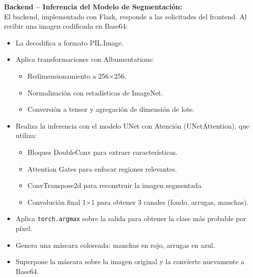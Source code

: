 \textbf{Backend – Inferencia del Modelo de Segmentación:}
\\
El backend, implementado con Flask, responde a las solicitudes del frontend. Al recibir una imagen codificada en Base64:
\begin{itemize}
\item La decodifica a formato PIL.Image.
\item Aplica transformaciones con Albumentations:
  \begin{itemize}
    \item Redimensionamiento a 256×256.
    \item Normalización con estadísticas de ImageNet.
    \item Conversión a tensor y agregación de dimensión de lote.
  \end{itemize}
\item Realiza la inferencia con el modelo UNet con Atención (UNetAttention), que utiliza:
    \begin{itemize}
    \item Bloques DoubleConv para extraer características.
    \item Attention Gates para enfocar regiones relevantes.
    \item ConvTranspose2d para reconstruir la imagen segmentada.
    \item Convolución final 1×1 para obtener 3 canales (fondo, arrugas, manchas).
  \end{itemize}
\item Aplica \texttt{torch.argmax} sobre la salida para obtener la clase más probable por píxel.
\item Genera una máscara coloreada: manchas en rojo, arrugas en azul.
\item Superpone la máscara sobre la imagen original y la convierte nuevamente a Base64.
\end{itemize}

